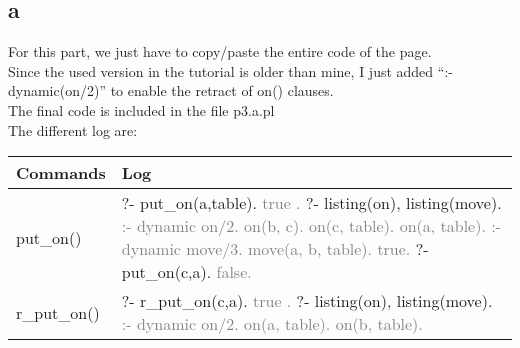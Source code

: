 \documentclass{article}
\begin{document}
        \subsection{a}
            For this part, we just have to copy/paste the entire code of the page.\\
            Since the used version in the tutorial is older than mine, I just added ``:-dynamic(on/2)'' to enable the retract of on() clauses.\\
            The final code is included in the file p3.a.pl\\
            The different log are:\\
            \begin{tabular}{|p{6cm}|p{6cm}|}
                \hline
                    \textbf{Commands} & \textbf{Log}\\
                \hline
                    put\_on() & ?- put\_on(a,table).
                    \newline \textcolor{gray}{    true .}
                    \newline ?- listing(on), listing(move).
                    \newline \textcolor{gray}{:- dynamic on/2.}
                    \newline \textcolor{gray}{    on(b, c).}
                    \newline \textcolor{gray}{    on(c, table).}
                    \newline \textcolor{gray}{    on(a, table).}
                    \newline \textcolor{gray}{:- dynamic move/3.}
                    \newline \textcolor{gray}{    move(a, b, table).}
                    \newline \textcolor{gray}{    true.}
                    \newline ?- put\_on(c,a).
                    \newline \textcolor{gray}{    false.}\\
                \hline
                    r\_put\_on() & ?- r\_put\_on(c,a).
                    \newline \textcolor{gray}{    true .}
                    \newline ?- listing(on), listing(move).
                    \newline \textcolor{gray}{:- dynamic on/2.}
                    \newline \textcolor{gray}{    on(a, table).}
                    \newline \textcolor{gray}{    on(b, table).}

\end{tabular}
\end{document}
